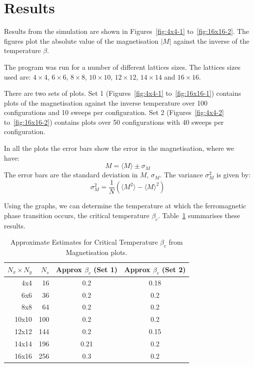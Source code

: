\documentclass[a4paper]{IEEEtran}
\newcommand{\av}[1]{\langle #1 \rangle}
\begin{document}

\section{Results}

    Results from the simulation are shown in Figures~\ref{fig:4x4-1} 
    to~\ref{fig:16x16-2}. 
    The figures plot the absolute value of the 
    magnetisation $|M|$ against the inverse of the
    temperature $\beta$.

    The program was run for a number of different lattices sizes.
    The lattices sizes used are: $4 \times 4$, 
    $6 \times 6$, $8 \times 8$, $10 \times 10$, $12 \times 12$,
    $14 \times 14$ and $16 \times 16$.

    There are two sets of plots. 
    Set 1 (Figures~\ref{fig:4x4-1} to~\ref{fig:16x16-1})
    contains plots of the magnetisation
    against the inverse temperature over 100 configurations
    and 10 sweeps per configuration. 
    Set 2 (Figures~\ref{fig:4x4-2} to~\ref{fig:16x16-2})
    contains plots over 50
    configurations with 40 sweeps per configuration.

    In all the plots the error bars show the error in the magnetisation,
    where we have:
    \[ M = \av{M} \pm \sigma_M \]
    The error bars are the standard deviation in $M$, $\sigma_M$. 
    The variance $\sigma_{M}^2$ is given by:
    \[ \sigma_{M}^2 = \frac{1}{N} \left( \av{M^2} - \av{M}^2 \right) \]

    Using the graphs, we can determine the temperature at which
    the ferromagnetic phase transition occurs, the critical temperature $\beta_c$.
    Table~\ref{tbl:betac} summarises these results.

    \begin{table}[ht]
        \begin{center} 
        \caption{Approximate Estimates for Critical Temperature
                 $\beta_c$ from Magnetisation plots.}
        \label{tbl:betac} 

        \begin{tabular}{|r|r|c|c|} \hline
        $N_x \times N_y$ & $N_s$ & Approx $\beta_c$ (Set 1)
                                 & Approx $\beta_c$ (Set 2) \\ \hline
        4x4   & 16  & 0.2 & 0.18 \\ \hline
        6x6   & 36  & 0.2 & 0.2  \\ \hline
        8x8   & 64  & 0.2 & 0.2  \\ \hline
        10x10 & 100 & 0.2 & 0.2  \\ \hline
        12x12 & 144 & 0.2 & 0.15 \\ \hline
        14x14 & 196 & 0.21 & 0.2 \\ \hline
        16x16 & 256 & 0.3 & 0.2  \\ \hline
        \end{tabular}
        \end{center} 
    \end{table} 
\end{document}
